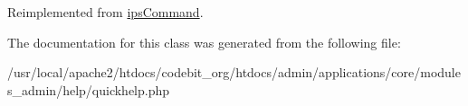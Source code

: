 Reimplemented from \hyperlink{classips_command_afbc4e912a0604b94d47d66744c64d8ba}{ips\-Command}.



The documentation for this class was generated from the following file\-:\begin{DoxyCompactItemize}
\item 
/usr/local/apache2/htdocs/codebit\-\_\-org/htdocs/admin/applications/core/modules\-\_\-admin/help/quickhelp.\-php\end{DoxyCompactItemize}
